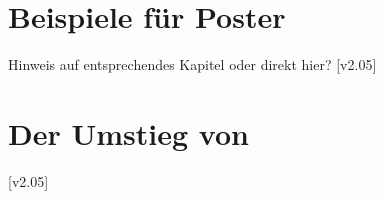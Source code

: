 \begin{Bundle*}[v2.05]{}
\section{Beispiele für Poster}
%
Hinweis auf entsprechendes Kapitel oder direkt hier?
[v2.05]

\section{Der Umstieg von }
%
[v2.05]

\end{Bundle*}
